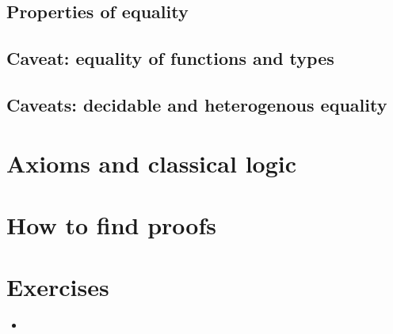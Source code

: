 \documentclass{beamer}
\begin{document}

\subsection{Properties of equality}


\subsection{Caveat: equality of functions and types}


\subsection{Caveats: decidable and heterogenous equality}

\section{Axioms and classical logic}


\section{How to find proofs}

\section{Exercises}

\begin{frame}{}
\begin{itemize}
	\item 
\end{itemize}
\end{frame}
\end{document}
